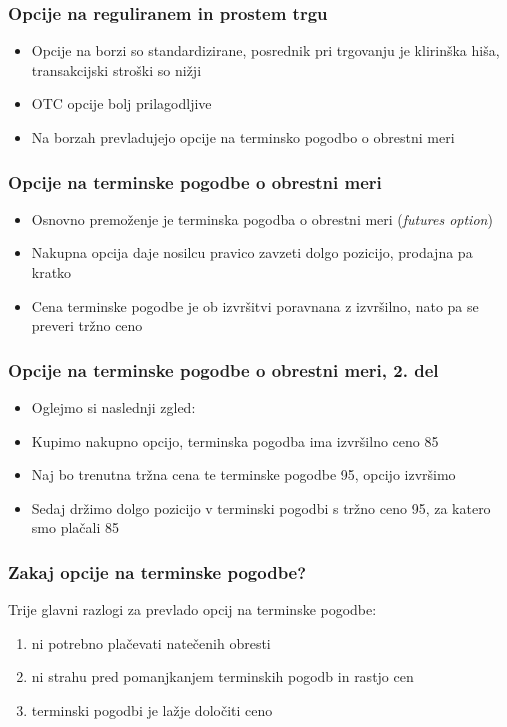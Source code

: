 \documentclass[14pt]{beamer}
\begin{document}
\begin{frame}
    \frametitle{Opcije na reguliranem in prostem trgu}
    \begin{itemize}
        \item Opcije na borzi so standardizirane, posrednik pri trgovanju je klirinška hiša, transakcijski stroški so nižji
        \item OTC opcije bolj prilagodljive
        \item Na borzah prevladujejo opcije na terminsko pogodbo o obrestni meri
    \end{itemize}
\end{frame}

\begin{frame}
    \frametitle{Opcije na terminske pogodbe o obrestni meri}
    \begin{itemize}
        \item Osnovno premoženje je terminska pogodba o obrestni meri (\textit{futures option})
        \item Nakupna opcija daje nosilcu pravico zavzeti dolgo pozicijo, prodajna pa kratko
        \item Cena terminske pogodbe je ob izvršitvi poravnana z izvršilno, nato pa se preveri tržno ceno
    \end{itemize}
\end{frame}

\begin{frame}
    \frametitle{Opcije na terminske pogodbe o obrestni meri, 2. del}
        \begin{itemize}
            \item Oglejmo si naslednji zgled:
            \item Kupimo nakupno opcijo, terminska pogodba ima izvršilno ceno 85\textdollar
            \item Naj bo trenutna tržna cena te terminske pogodbe 95\textdollar, opcijo izvršimo
            \item Sedaj držimo dolgo pozicijo v terminski pogodbi s tržno ceno 95\textdollar, za katero smo plačali 85\textdollar
        \end{itemize}
\end{frame}

\begin{frame}
    \frametitle{Zakaj opcije na terminske pogodbe?}
    Trije glavni razlogi za prevlado opcij na terminske pogodbe:
    \begin{enumerate}
        \item ni potrebno plačevati natečenih obresti
        \item ni strahu pred pomanjkanjem terminskih pogodb in rastjo cen
        \item terminski pogodbi je lažje določiti ceno
    \end{enumerate}
\end{frame}
        
\end{document}
